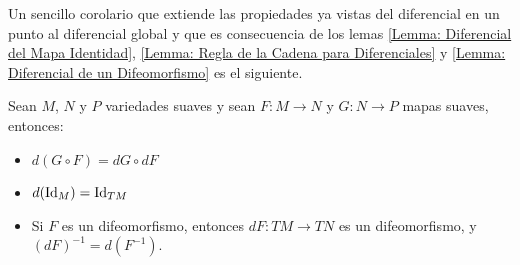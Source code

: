 Un sencillo corolario que extiende las propiedades ya vistas del diferencial en un punto al diferencial global y que es consecuencia de los lemas \ref{Lemma: Diferencial del Mapa Identidad}, \ref{Lemma: Regla de la Cadena para Diferenciales} y \ref{Lemma: Diferencial de un Difeomorfismo} es el siguiente.

\begin{corollary}\label{Corolario: Propiedades de los diferenciales}
	Sean $M$, $N$ y $P$ variedades suaves y sean $F: M \to N$ y $G: N \to P$ mapas suaves, entonces:
	\begin{itemize}
		\item $d(G \circ F) = dG \circ dF$
		\item $d(\mathrm{Id}_M) = \mathrm{Id}_{TM}$
		\item Si $F$ es un difeomorfismo, entonces $dF: TM \to TN$ es un difeomorfismo, y $(dF)^{-1} = d(F^{-1})$.
	\end{itemize}
\end{corollary}
